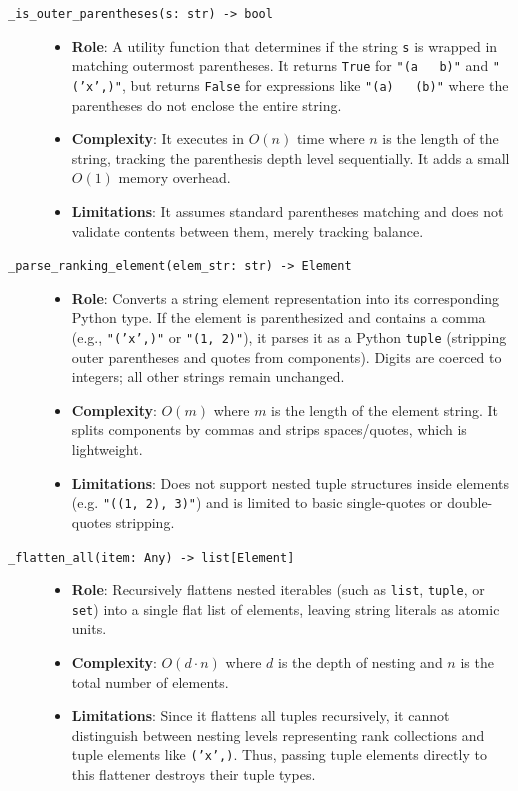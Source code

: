 \documentclass[11pt]{article}
\newcommand{\pathitem}[1]{\texttt{#1}}
\begin{document}
\begin{description}
  \item[\pathitem{\_is\_outer\_parentheses(s: str) -> bool}]
  \begin{itemize}
    \item \textbf{Role}: A utility function that determines if the string \texttt{s} is wrapped in matching outermost parentheses. It returns \texttt{True} for \texttt{"(a \string~ b)"} and \texttt{"('x',)"}, but returns \texttt{False} for expressions like \texttt{"(a) \string~ (b)"} where the parentheses do not enclose the entire string.
    \item \textbf{Complexity}: It executes in $O(n)$ time where $n$ is the length of the string, tracking the parenthesis depth level sequentially. It adds a small $O(1)$ memory overhead.
    \item \textbf{Limitations}: It assumes standard parentheses matching and does not validate contents between them, merely tracking balance.
  \end{itemize}

  \item[\pathitem{\_parse\_ranking\_element(elem\_str: str) -> Element}]
  \begin{itemize}
    \item \textbf{Role}: Converts a string element representation into its corresponding Python type. If the element is parenthesized and contains a comma (e.g., \texttt{"('x',)"} or \texttt{"(1, 2)"}), it parses it as a Python \texttt{tuple} (stripping outer parentheses and quotes from components). Digits are coerced to integers; all other strings remain unchanged.
    \item \textbf{Complexity}: $O(m)$ where $m$ is the length of the element string. It splits components by commas and strips spaces/quotes, which is lightweight.
    \item \textbf{Limitations}: Does not support nested tuple structures inside elements (e.g. \texttt{"((1, 2), 3)"}) and is limited to basic single-quotes or double-quotes stripping.
  \end{itemize}

  \item[\pathitem{\_flatten\_all(item: Any) -> list[Element]}]
  \begin{itemize}
    \item \textbf{Role}: Recursively flattens nested iterables (such as \texttt{list}, \texttt{tuple}, or \texttt{set}) into a single flat list of elements, leaving string literals as atomic units.
    \item \textbf{Complexity}: $O(d \cdot n)$ where $d$ is the depth of nesting and $n$ is the total number of elements.
    \item \textbf{Limitations}: Since it flattens all tuples recursively, it cannot distinguish between nesting levels representing rank collections and tuple elements like \texttt{('x',)}. Thus, passing tuple elements directly to this flattener destroys their tuple types.
  \end{itemize}


\end{description}
\end{document}
